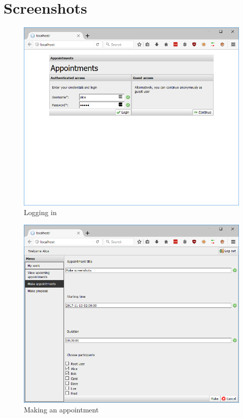 \documentclass{article}
\begin{document}
	\newpage
	\appendix
	\section{Screenshots}
	
	\begin{figure}[h!]
		\includegraphics[width=\textwidth]{01_login}
		\caption{Logging in}
	\end{figure}
	
	\begin{figure}[h!]
		\includegraphics[width=\textwidth]{02_make_appointment}
		\caption{Making an appointment}
	\end{figure}
	
\end{document}
